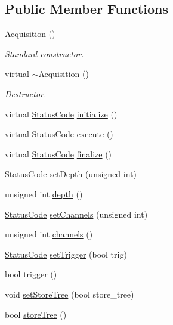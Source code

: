 \subsection*{Public Member Functions}
\begin{DoxyCompactItemize}
\item 
\hyperlink{classAcquisition_aa7d3138495a4a8888c21b33f4d657732}{Acquisition} ()
\begin{DoxyCompactList}\small\item\em Standard constructor. \end{DoxyCompactList}\item 
virtual \hyperlink{classAcquisition_a3b0205ba385e2da70abb5a351c4dbf0f}{$\sim$\+Acquisition} ()
\begin{DoxyCompactList}\small\item\em Destructor. \end{DoxyCompactList}\item 
virtual \hyperlink{classStatusCode}{Status\+Code} \hyperlink{classAcquisition_acffc6b70b80811657409f92e489584ba}{initialize} ()
\item 
virtual \hyperlink{classStatusCode}{Status\+Code} \hyperlink{classAcquisition_ae3b63064bee1b042914b63ae4135cbd8}{execute} ()
\item 
virtual \hyperlink{classStatusCode}{Status\+Code} \hyperlink{classAcquisition_ab8ffcd86548280f0403b3ae6338f2499}{finalize} ()
\item 
\hyperlink{classStatusCode}{Status\+Code} \hyperlink{classAcquisition_a303145d497f99da966fcfd95c00cd81e}{set\+Depth} (unsigned int)
\item 
unsigned int \hyperlink{classAcquisition_a1ad973e21a067c0de0b6264d0eb5182b}{depth} ()
\item 
\hyperlink{classStatusCode}{Status\+Code} \hyperlink{classAcquisition_a3ee93f665573b4622bd9cba92c0cc04e}{set\+Channels} (unsigned int)
\item 
unsigned int \hyperlink{classAcquisition_a3041537afcb4dfe5c6940f0ef6829265}{channels} ()
\item 
\hyperlink{classStatusCode}{Status\+Code} \hyperlink{classAcquisition_acdb167b43f3babb59a98698aa5c5066f}{set\+Trigger} (bool trig)
\item 
bool \hyperlink{classAcquisition_a6f680938eb6a42d57dfa7466e8852af9}{trigger} ()
\item 
void \hyperlink{classAcquisition_a759193856d26354722e5f647e60e16de}{set\+Store\+Tree} (bool store\+\_\+tree)
\item 
bool \hyperlink{classAcquisition_a8ab7e58ccb3fee54eb6850e5081fae10}{store\+Tree} ()

\end{DoxyCompactItemize}
